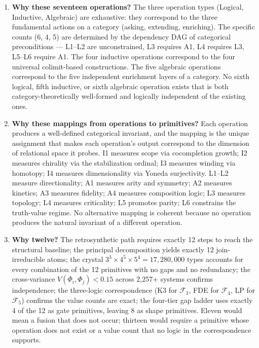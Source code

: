 \documentclass[12pt,a4paper]{article}
\begin{document}
\begin{enumerate}
 \item \textbf{Why these seventeen operations?} The three operation types (Logical, Inductive, Algebraic) are
exhaustive: they correspond to the three fundamental actions on a category (asking, extending, enriching). The specific
counts (6, 4, 5) are determined by the dependency DAG of categorical preconditions --- L1--L2 are unconstrained, L3
requires A1, L4 requires L3, L5--L6 require A1. The four inductive operations correspond to the four universal
colimit-based constructions. The five algebraic operations correspond to the five independent enrichment layers of a
category. No sixth logical, fifth inductive, or sixth algebraic operation exists that is both category-theoretically
well-formed and logically independent of the existing ones.
 \item \textbf{Why these mappings from operations to primitives?} Each operation produces a well-defined categorical
invariant, and the mapping is the unique assignment that makes each operation's output correspond to the dimension of
relational space it probes. I1 measures scope via cocompletion growth; I2 measures chirality via the stabilization ordinal;
I3 measures winding via homotopy; I4 measures dimensionality via Yoneda surjectivity. L1--L2 measure directionality; A1
measures arity and symmetry; A2 measures kinetics; A3 measures fidelity; A4 measures composition logic; L3 measures
topology; L4 measures criticality; L5 promotes parity; L6 constrains the truth-value regime. No alternative mapping is
coherent because no operation produces the natural invariant of a different operation.
 \item \textbf{Why twelve?} The retrosynthetic path requires exactly 12 steps to reach the structural baseline; the
principal decomposition yields exactly 12 join-irreducible atoms; the crystal $3^3 \times 4^5 \times 5^4 = 17{,}280{,}000$ types accounts for every combination of the 12 primitives with no gaps and no redundancy; the
cross-variance $V(\Phi_i,\Phi_j) < 0.15$ across 2,257+ systems confirms independence; the three-logic correspondence
(K3 for $\mathcal{F}_3$, FDE for $\mathcal{F}_4$, LP for $\mathcal{F}_5$) confirms the value counts are exact; the
four-tier gap ladder uses exactly 4 of the 12 as gate primitives, leaving 8 as shape primitives. Eleven would mean a
fusion that does not occur; thirteen would require a primitive whose operation does not exist or a value count that no logic in the correspondence supports.
\end{enumerate}
\end{document}
